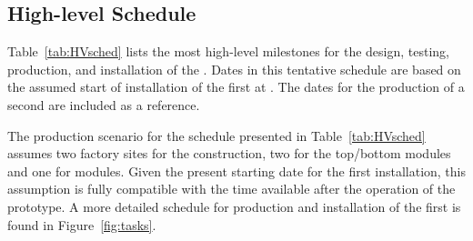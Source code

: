 \subsection{High-level Schedule}
\label{sec:fdsp-hv-org-cs}

Table~\ref{tab:HVsched} lists the most high-level milestones for the design, testing, production, and installation of the  . Dates in this tentative schedule are based on the assumed start of installation of the first  at . The dates for the  production of a second  are %
included as a reference.

 The production scenario %
 for the schedule presented in Table~\ref{tab:HVsched} assumes %
 two factory sites for the  construction, two for the top/bottom  modules and one for  modules. Given the present starting date %
 for  the first  installation, this assumption is fully compatible with the time available after the operation of the  prototype.
 A more detailed schedule for production and installation of the first  is found in %
 Figure~\ref{fig:tasks}.

